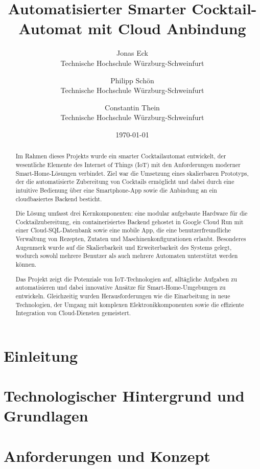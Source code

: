 \documentclass[a4paper, 12pt]{article} %
\title{Automatisierter Smarter Cocktail-Automat mit Cloud Anbindung}
\author{ 
  Jonas Eck \\
	Technische Hochschule Würzburg-Schweinfurt\\
	\and 
	Philipp Schön \\
	Technische Hochschule Würzburg-Schweinfurt\\
	\and 
  Constantin Thein\\
	Technische Hochschule Würzburg-Schweinfurt\\
	}
\date{\today}
\begin{document}
\maketitle
\newpage
\tableofcontents
\newpage

\begin{abstract}
Im Rahmen dieses Projekts wurde ein smarter Cocktailautomat entwickelt, der wesentliche Elemente des
Internet of Things (IoT) mit den Anforderungen moderner Smart-Home-Lösungen verbindet. Ziel war die
Umsetzung eines skalierbaren Prototyps, der die automatisierte Zubereitung von Cocktails ermöglicht 
und dabei durch eine intuitive Bedienung über eine Smartphone-App sowie die Anbindung an ein 
cloudbasiertes Backend besticht.

Die Lösung umfasst drei Kernkomponenten: eine modular aufgebaute Hardware für die 
Cocktailzubereitung, ein containerisiertes Backend gehostet in Google Cloud Run mit einer 
Cloud-SQL-Datenbank sowie eine mobile App, die eine benutzerfreundliche Verwaltung von Rezepten, 
Zutaten und Maschinenkonfigurationen erlaubt. Besonderes Augenmerk wurde auf die Skalierbarkeit und 
Erweiterbarkeit des Systems gelegt, wodurch sowohl mehrere Benutzer als auch mehrere Automaten 
unterstützt werden können.

Das Projekt zeigt die Potenziale von IoT-Technologien auf, alltägliche Aufgaben zu automatisieren 
und dabei innovative Ansätze für Smart-Home-Umgebungen zu entwickeln. Gleichzeitig wurden 
Herausforderungen wie die Einarbeitung in neue Technologien, der Umgang mit komplexen 
Elektronikkomponenten sowie die effiziente Integration von Cloud-Diensten gemeistert.
\end{abstract}
\newpage

\section{Einleitung}
    
\newpage

\section{Technologischer Hintergrund und Grundlagen}
    
\newpage

\section{Anforderungen und Konzept}
    
\newpage
\end{document}

